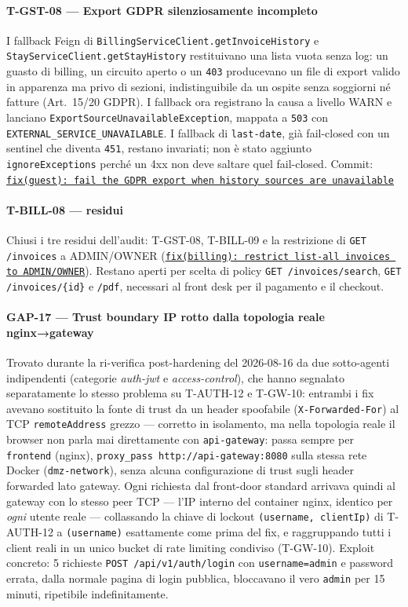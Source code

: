 ﻿\documentclass[a4paper,12pt]{report}
\newcommand{\commitref}[2]{\texttt{\small \href{https://github.com/diegoandruccioli/hotel-pms/commit/#1}{#2}}}
\begin{document}
\paragraph{T-GST-08 --- Export GDPR silenziosamente incompleto}
I fallback Feign di \texttt{BillingServiceClient.getInvoiceHistory} e
\texttt{StayServiceClient.getStayHistory} restituivano una lista vuota
senza log: un guasto di billing, un circuito aperto o un \texttt{403}
producevano un file di export valido in apparenza ma privo di sezioni,
indistinguibile da un ospite senza soggiorni né fatture (Art.~15/20
GDPR). I fallback ora registrano la causa a livello WARN e lanciano
\texttt{ExportSourceUnavailableException}, mappata a \texttt{503} con
\texttt{EXTERNAL\_SERVICE\_UNAVAILABLE}. I fallback di \texttt{last-date},
già fail-closed con un sentinel che diventa \texttt{451}, restano
invariati; non è stato aggiunto \texttt{ignoreExceptions} perché un 4xx non
deve saltare quel fail-closed.
Commit: \commitref{bdb22dd}{fix(guest): fail the GDPR export when history sources are unavailable}

\paragraph{T-BILL-08 --- residui}
Chiusi i tre residui dell'audit: T-GST-08, T-BILL-09 e la restrizione di
\texttt{GET /invoices} a ADMIN/OWNER (\commitref{ce2552e}{fix(billing): restrict list-all invoices to ADMIN/OWNER}).
Restano aperti per scelta di policy \texttt{GET /invoices/search},
\texttt{GET /invoices/\{id\}} e \texttt{/pdf}, necessari al front desk per il
pagamento e il checkout.

\paragraph{GAP-17 --- Trust boundary IP rotto dalla topologia reale nginx→gateway}
Trovato durante la ri-verifica post-hardening del 2026-08-16 da due
sotto-agenti indipendenti (categorie \emph{auth-jwt} e \emph{access-control}),
che hanno segnalato separatamente lo stesso problema su T-AUTH-12 e T-GW-10:
entrambi i fix avevano sostituito la fonte di trust da un header
spoofabile (\texttt{X-Forwarded-For}) al TCP \texttt{remoteAddress} grezzo
--- corretto in isolamento, ma nella topologia reale il browser non parla
mai direttamente con \texttt{api-gateway}: passa sempre per \texttt{frontend}
(nginx), \texttt{proxy\_pass http://api-gateway:8080} sulla stessa rete
Docker (\texttt{dmz-network}), senza alcuna configurazione di trust sugli
header forwarded lato gateway. Ogni richiesta dal front-door standard
arrivava quindi al gateway con lo stesso peer TCP --- l'IP interno del
container nginx, identico per \emph{ogni} utente reale --- collassando la
chiave di lockout \texttt{(username, clientIp)} di T-AUTH-12 a
\texttt{(username)} esattamente come prima del fix, e raggruppando tutti i
client reali in un unico bucket di rate limiting condiviso (T-GW-10).
Exploit concreto: 5 richieste \texttt{POST /api/v1/auth/login} con
\texttt{username=admin} e password errata, dalla normale pagina di login
pubblica, bloccavano il vero \texttt{admin} per 15 minuti, ripetibile
indefinitamente.
\end{document}
